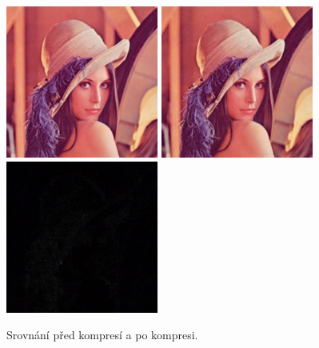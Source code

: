 \documentclass[11pt,a4paper]{article}
\begin{document}
\begin{figure}[H]
  \centering
  \includegraphics[width=5cm]{sample3.pdf}
  \includegraphics[width=5cm]{sample3_out.pdf}
  \includegraphics[width=5cm]{sample3_diff.pdf}
  \caption{Srovnání před kompresí a po kompresi.}
  \label{pipeline}
\end{figure}
\end{document}
